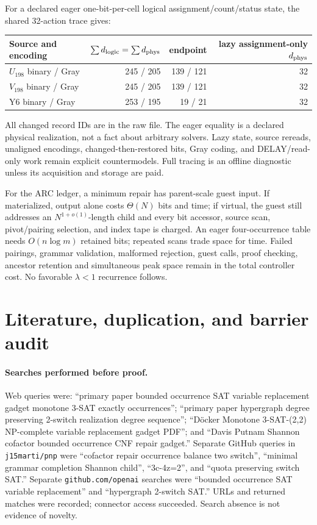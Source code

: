 \documentclass[11pt]{article}
\begin{document}
For a declared eager one-bit-per-cell logical assignment/count/status state,
the shared 32-action trace gives:
\begin{center}
\begin{tabular}{lrrr}
\toprule
Source and encoding & $\sum d_{\rm logic}=\sum d_{\rm phys}$ & endpoint & lazy assignment-only $d_{\rm phys}$\\
\midrule
$U_{198}$ binary / Gray &245 / 205&139 / 121&32\\
$V_{198}$ binary / Gray &245 / 205&139 / 121&32\\
Y6 binary / Gray &253 / 195&19 / 21&32\\
\bottomrule
\end{tabular}
\end{center}
All changed record IDs are in the raw file.  The eager equality is a declared
physical realization, not a fact about arbitrary solvers.  Lazy state,
source rereads, unaligned encodings, changed-then-restored bits, Gray coding,
and DELAY/read-only work remain explicit countermodels.  Full tracing is an
offline diagnostic unless its acquisition and storage are paid.

For the ARC ledger, a minimum repair has parent-scale guest input.  If
materialized, output alone costs $\Theta(N)$ bits and time; if virtual, the
guest still addresses an $N^{1+o(1)}$-length child and every bit accessor,
source scan, pivot/pairing selection, and index tape is charged.  An eager
four-occurrence table needs $O(n\log m)$ retained bits; repeated scans trade
space for time.  Failed pairings, grammar validation, malformed rejection,
guest calls, proof checking, ancestor retention and simultaneous peak space
remain in the total controller cost.  No favorable $\lambda<1$ recurrence
follows.

\section{Literature, duplication, and barrier audit}
\paragraph{Searches performed before proof.}
Web queries were: ``primary paper bounded occurrence SAT variable replacement
gadget monotone 3-SAT exactly occurrences''; ``primary paper hypergraph
degree preserving 2-switch realization degree sequence''; ``D\"ocker
Monotone 3-SAT-(2,2) NP-complete variable replacement gadget PDF''; and
``Davis Putnam Shannon cofactor bounded occurrence CNF repair gadget.''
Separate GitHub queries in \texttt{j15marti/pnp} were ``cofactor repair
occurrence balance two switch'', ``minimal grammar completion Shannon
child'', ``3c-4z=2'', and ``quota preserving switch SAT.''  Separate
\texttt{github.com/openai} searches were ``bounded occurrence SAT variable
replacement'' and ``hypergraph 2-switch SAT.''  URLs and returned matches
were recorded; connector access succeeded.  Search absence is not evidence
of novelty.
\end{document}
